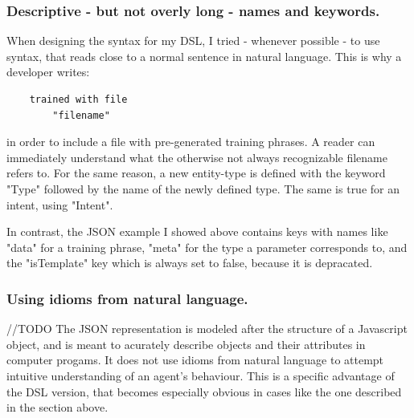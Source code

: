 \subsubsection{Descriptive - but not overly long - names and keywords.}

When designing the syntax for my DSL, I tried - whenever possible - to use syntax, that reads close to a normal sentence in natural language. This is why a developer writes: 
\begin{verbatim}
    trained with file
        "filename"
\end{verbatim}
in order to include a file with pre-generated training phrases. A reader can immediately understand what the otherwise not always recognizable filename refers to.
For the same reason, a new entity-type is defined with the keyword "Type" followed by the name of the newly defined type. The same is true for an intent, using "Intent".

In contrast, the JSON example I showed above contains keys with names like "data" for a training phrase, "meta" for the type a parameter corresponds to, and the "isTemplate" key which is always set to false, because it is depracated.

\subsubsection{Using idioms from natural language.}
//TODO
The JSON representation is modeled after the structure of a Javascript object, and is meant to acurately describe objects and their attributes in computer progams. It does not use idioms from natural language to attempt intuitive understanding of an agent's behaviour.
This is a specific advantage of the DSL version, that becomes especially obvious in cases like the one described in the section above.

